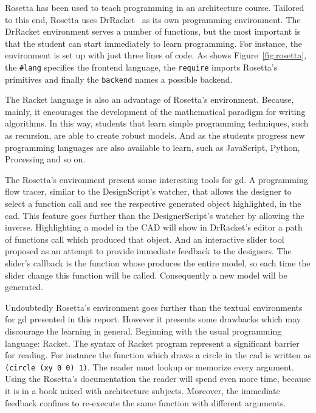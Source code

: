 Rosetta has been used to teach programming in an architecture course. Tailored to this end, Rosetta uses DrRacket~\cite{findler2002drscheme} as its own programming environment. The DrRacket environment serves a number of functions, but the most important is that the student can start immediately to learn programming. For instance, the environment is set up with just three lines of code. As shows Figure~\ref{fig:rosetta}, the \texttt{\#lang} specifies the frontend language, the \texttt{require} imports Rosetta's primitives and finally the \texttt{backend} names a possible backend.

The Racket language is also an advantage of Rosetta's environment. Because, mainly, it encourages the development of the mathematical paradigm for writing algorithms. In this way, students that learn simple programming techniques, such as recursion, are able to create robust models. And as the students progress new programming languages are also available to learn, such as JavaScript, Python, Processing and so on.

The Rosetta's environment present some interesting tools for \ac{gd}. A programming flow tracer, similar to the DesignScript's watcher, that allows the designer to select a function call and see the respective generated object highlighted, in the \ac{cad}. This feature goes further than the DesignerScript's watcher by allowing the inverse. Highlighting a model in the CAD will show in DrRacket's editor a path of functions call which produced that object. And an interactive slider tool proposed as an attempt to provide immediate feedback to the designers. The slider's callback is the function whose produces the entire model, so each time the slider change this function will be called. Consequently a new model will be generated.

Undoubtedly Rosetta's environment goes further than the textual environments for \ac{gd} presented in this report. However it presents some drawbacks which may discourage the learning in general. Beginning with the usual programming language: Racket. The syntax of Racket program represent a significant barrier for reading. For instance the function which draws a circle in the \ac{cad} is written as \texttt{(circle (xy 0 0) 1)}. The reader must lookup or memorize every argument. Using the Rosetta's documentation the reader will spend even more time, because it is in a book mixed with architecture subjects. Moreover, the immediate feedback confines to re-execute the same function with different arguments.
